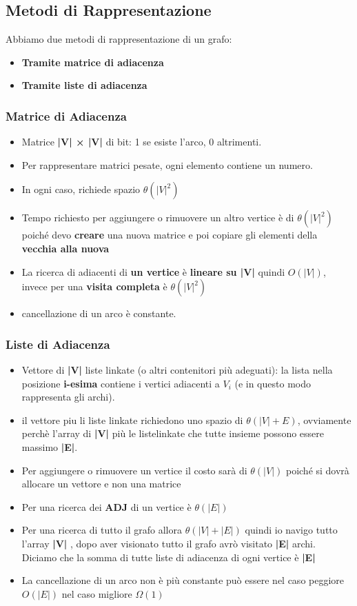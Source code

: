 \subsection{Metodi di Rappresentazione}
Abbiamo due metodi di rappresentazione di un grafo:
\begin{itemize}
    \item  \textbf{Tramite matrice di adiacenza}
    \item  \textbf{Tramite liste di adiacenza} 
\end{itemize}
\subsubsection{Matrice di Adiacenza}
\begin{itemize}
    \item Matrice \textbf{|V| × |V|} di bit: 1 se esiste l’arco, 0 altrimenti.
\item Per rappresentare matrici pesate, ogni elemento contiene
un numero.
\item In ogni caso, richiede spazio $\theta(|V|^2)$
\item Tempo richiesto per aggiungere o rimuovere un altro vertice è di $\theta(|V|^2)$ poiché devo \textbf{creare} una nuova matrice e poi copiare gli elementi della \textbf{vecchia alla nuova}
\item La ricerca di adiacenti di \textbf{un vertice} è \textbf{lineare su |V|} quindi $O(|V|)$, invece per una \textbf{visita completa} è $\theta(|V|^2)$
\item cancellazione di un arco è constante.
\end{itemize}
\subsubsection{Liste di Adiacenza}
\begin{itemize}
    \item Vettore di \textbf{|V|} liste linkate (o altri contenitori più adeguati): la
    lista nella posizione \textbf{i-esima} contiene i vertici adiacenti a $V_i$
    (e in questo modo rappresenta gli archi).
    \item il vettore piu li liste linkate richiedono uno spazio di $\theta(|V| + E)$, ovviamente perchè l'array di \textbf{|V|} più le  listelinkate che tutte insieme possono essere massimo \textbf{|E|}.
    \item Per aggiungere o rimuovere un vertice il costo sarà di $\theta(|V|)$ poiché si dovrà allocare un vettore e non una matrice
    \item Per una ricerca dei \textbf{ADJ} di un vertice è $\theta(|E|)$
    \item Per una ricerca di tutto il grafo allora $\theta(|V| + |E|)$ quindi  io navigo tutto l'array \textbf{|V|} , dopo aver visionato tutto il grafo avrò visitato \textbf{|E|} archi. Diciamo che la somma di tutte liste di adiacenza di ogni vertice è \textbf{|E|}
    \item La cancellazione di un arco non è più constante può essere nel caso peggiore $O(|E|)$ nel caso migliore $\Omega(1)$
    
\end{itemize}

